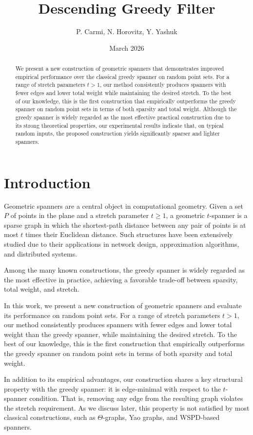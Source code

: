 \documentclass{article}
\title{Descending Greedy Filter}
\author{P. Carmi, N. Horovitz, Y. Yashuk}
\date{March 2026}
\begin{document}
\maketitle

\begin{abstract}
 We present a new construction of geometric spanners that demonstrates improved empirical performance over the classical greedy spanner on random point sets. For a range of stretch parameters $t>1$, our method consistently produces spanners with fewer edges and lower total weight while maintaining the desired stretch. To the best of our knowledge, this is the first construction that empirically outperforms the greedy spanner on random point sets in terms of both sparsity and total weight. Although the greedy spanner is widely regarded as the most effective practical construction due to its strong theoretical properties, our experimental results indicate that, on typical random inputs, the proposed construction yields significantly sparser and lighter spanners.
\end{abstract}



\section{Introduction}
Geometric spanners are a central object in computational geometry. Given a set $P$ of points in the plane and a stretch parameter $t \ge 1$, a geometric $t$-spanner is a sparse graph in which the shortest-path distance between any pair of points is at most $t$ times their Euclidean distance. Such structures have been extensively studied due to their applications in network design, approximation algorithms, and distributed systems.

Among the many known constructions, the greedy spanner is widely regarded as the most effective in practice, achieving a favorable trade-off between sparsity, total weight, and stretch. 

In this work, we present a new construction of geometric spanners and evaluate its performance on random point sets. For a range of stretch parameters $t>1$, our method consistently produces spanners with fewer edges and lower total weight than the greedy spanner, while maintaining the desired stretch. To the best of our knowledge, this is the first construction that empirically outperforms the greedy spanner on random point sets in terms of both sparsity and total weight.

In addition to its empirical advantages, our construction shares a key structural property with the greedy spanner: it is edge-minimal with respect to the $t$-spanner condition. That is, removing any edge from the resulting graph violates the stretch requirement. As we discuss later, this property is not satisfied by most classical constructions, such as $\Theta$-graphs, Yao graphs, and WSPD-based spanners.
\end{document}
